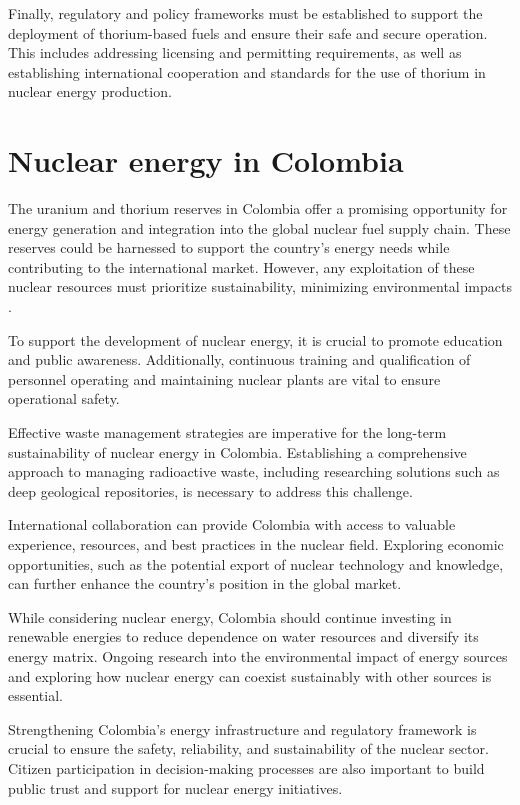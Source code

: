 Finally, regulatory and policy frameworks must be established to support the deployment of thorium-based fuels and ensure their safe and secure operation. This includes addressing licensing and permitting requirements, as well as establishing international cooperation and standards for the use of thorium in nuclear energy production.

\section{Nuclear energy in Colombia}

The uranium and thorium reserves in Colombia offer a promising opportunity for energy generation and integration into the global nuclear fuel supply chain. These reserves could be harnessed to support the country's energy needs while contributing to the international market. However, any exploitation of these nuclear resources must prioritize sustainability, minimizing environmental impacts \cite{UraniumGlobal,ReservasUranio}.

To support the development of nuclear energy, it is crucial to promote education and public awareness. Additionally, continuous training and qualification of personnel operating and maintaining nuclear plants are vital to ensure operational safety.

Effective waste management strategies are imperative for the long-term sustainability of nuclear energy in Colombia. Establishing a comprehensive approach to managing radioactive waste, including researching solutions such as deep geological repositories, is necessary to address this challenge.

International collaboration can provide Colombia with access to valuable experience, resources, and best practices in the nuclear field. Exploring economic opportunities, such as the potential export of nuclear technology and knowledge, can further enhance the country's position in the global market.

While considering nuclear energy, Colombia should continue investing in renewable energies to reduce dependence on water resources and diversify its energy matrix. Ongoing research into the environmental impact of energy sources and exploring how nuclear energy can coexist sustainably with other sources is essential.

Strengthening Colombia's energy infrastructure and regulatory framework is crucial to ensure the safety, reliability, and sustainability of the nuclear sector. Citizen participation in decision-making processes are also important to build public trust and support for nuclear energy initiatives.

